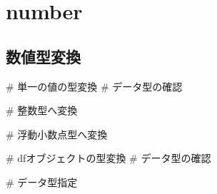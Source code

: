 \documentclass[letterpaper,10pt,dvipdfmx]{sphinxmanual}
\begin{document}
\section{number}
\label{\detokenize{Transform/types/number:number}}\label{\detokenize{Transform/types/number:making-a-table}}\label{\detokenize{Transform/types/number::doc}}

\subsection{数値型変換}
\label{\detokenize{Transform/types/number:id1}}
\# 単一の値の型変換
\# データ型の確認

%
\begin{sphinxVerbatim}[commandchars=\\\{\}]
  
\end{sphinxVerbatim}

\# 整数型へ変換

%
\begin{sphinxVerbatim}[commandchars=\\\{\}]
  
\end{sphinxVerbatim}

\# 浮動小数点型へ変換

%
\begin{sphinxVerbatim}[commandchars=\\\{\}]
  
\end{sphinxVerbatim}

\# dfオブジェクトの型変換
\# データ型の確認

%
\begin{sphinxVerbatim}[commandchars=\\\{\}]
   \PYG{p}{[}  \PYG{p}{]}
\end{sphinxVerbatim}

\# データ型指定

%
\begin{sphinxVerbatim}[commandchars=\\\{\}]
\PYG{p}{[}\PYG{p}{]}  
\PYG{p}{[}\PYG{p}{]}  
\end{sphinxVerbatim}
\end{document}
